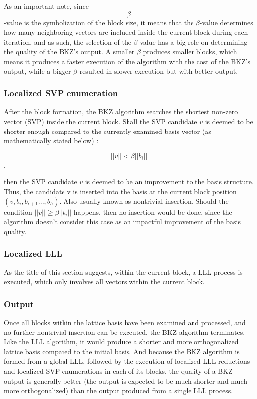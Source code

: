 \documentclass[runningheads]{llncs}
\begin{document}
As an important note, since $$\beta$$-value is the symbolization of the block size, it means that the $\beta$-value determines how many neighboring vectors are included inside the current block during each iteration, and as such, the selection of the $\beta$-value has a big role on determining the quality of the BKZ's output. A smaller $\beta$ produces smaller blocks, which means it produces a faster execution of the algorithm with the cost of the BKZ's output, while a bigger $\beta$ resulted in slower execution but with better output.

\subsubsection{Localized SVP enumeration}
\mbox{}
After the block formation, the BKZ algorithm searches the shortest non-zero vector (SVP) inside the current block. Shall the SVP candidate $v$ is deemed to be shorter enough compared to the currently examined basis vector (as mathematically stated below) :

$$||v|| < \beta||b_i||$$, 

then the SVP candidate $v$ is deemed to be an improvement to the basis structure. Thus, the candidate v is inserted into the basis at the current block position $(v,b_i,b_{i+1}...,b_h)$. Also usually known as nontrivial insertion. Should the condition $||v|| \ge \beta||b_i||$ happens, then no insertion would be done, since the algorithm doesn't consider this case as an impactful improvement of the basis quality. 

\subsubsection{Localized LLL}
\mbox{}
As the title of this section suggests, within the current block, a LLL process is executed, which only involves all vectors within the current block. 

\subsubsection{Output}
\mbox{}
Once all blocks within the lattice basis have been examined and processed, and no further nontrivial insertion can be executed, the BKZ algorithm terminates. Like the LLL algorithm, it would produce a shorter and more orthogonalized lattice basis compared to the initial basis. And because the BKZ algorithm is formed from a global LLL, followed by the execution of localized LLL reductions and localized SVP enumerations in each of its blocks, the quality of a BKZ output is generally better (the output is expected to be much shorter and much more orthogonalized) than the output produced from a single LLL process. 
\end{document}
